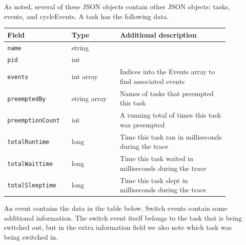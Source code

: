 \documentclass{hmcclinic}
\begin{document}
  As noted, several of these JSON objects contain other JSON objects: tasks,
  events, and cycleEvents. A task has the following data.

  \begin{center}
    \begin{tabular}{p{0.25\linewidth}p{0.2\linewidth}p{0.45\linewidth}}
      \toprule
      Field           & Type         & Additional description \\
      \midrule
       \texttt{name}            & string       & \\
       \texttt{pid}             & int          & \\
       \texttt{events}          & int array    & Indices into the Events array to find associated events\\
       \texttt{preemptedBy}     & string array & Names of tasks that preempted this task \\
      \texttt{preemptionCount} & int          & A running total of times this task was preempted                    \\
       \texttt{totalRuntime}    & long         & Time this task ran in milliseconds during the trace        \\
       \texttt{totalWaittime}   & long         & Time this task waited in milliseconds during the trace     \\
       \texttt{totalSleeptime}  & long         & Time this task slept in milliseconds during the trace\\
      \bottomrule
    \end{tabular}
  \end{center}

  An event contains the data in the table below. Switch events contain some additional
  information. The switch event itself belongs to the task that is being
  switched out, but in the extra information field we also note which task
  was being switched in.
\end{document}
